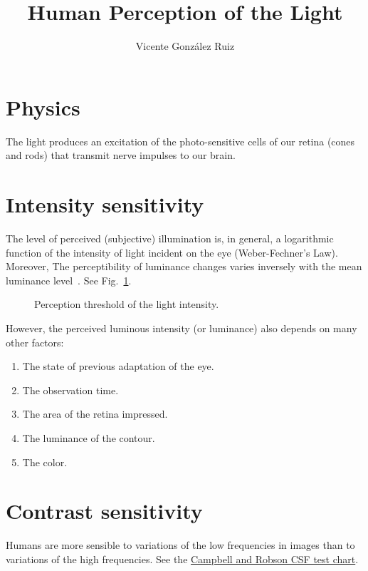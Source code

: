 \title{Human Perception of the Light}
\author{Vicente González Ruiz}
\maketitle

\section{Physics}
The light produces an excitation of the photo-sensitive cells of our
retina (cones and rods) that transmit nerve impulses to our brain.

\section{Intensity sensitivity~\cite{gonzalez1992digital}}
The level of perceived (subjective) illumination is, in general, a
logarithmic function of the intensity of light incident on the eye
(Weber-Fechner's Law). Moreover, The perceptibility of luminance
changes varies inversely with the mean luminance
level~\cite{taubman2012jpeg2000}. See
  Fig.~\ref{fig:light_perception_threshold}.

\begin{figure}
  \caption{Perception threshold of the light intensity.} %
  \label{fig:light_perception_threshold}
\end{figure}

However, the perceived luminous intensity (or luminance) also depends on many other factors:
\begin{enumerate}
\tightlist
\item The state of previous adaptation of the eye.
\item The observation time.
\item The area of the retina impressed.
\item The luminance of the contour.
\item The color.
\end{enumerate}

\section{Contrast sensitivity}
Humans are more sensible to variations of the low frequencies in
images than to variations of the high frequencies. See the
\href{CSF.html}{Campbell and Robson CSF test chart}.
  

